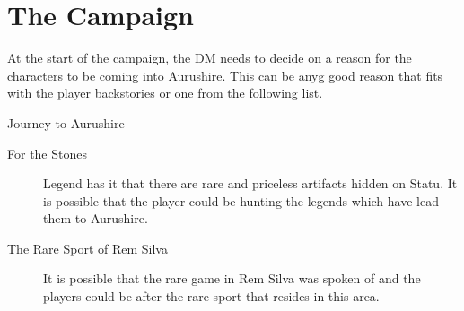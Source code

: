 \chapter{The Campaign}

At the start of the campaign, the DM needs to decide on a reason for the characters to be coming into Aurushire. This can be anyg good reason that fits with the player backstories or one from the following list.

\begin{commentbox}{Journey to Aurushire}
	\begin{description}
		\item[For the Stones] Legend has it that there are rare and priceless artifacts hidden on Statu. It is possible that the player could be hunting the legends which have lead them to Aurushire.
		\item[The Rare Sport of Rem Silva] It is possible that the rare game in Rem Silva was spoken of and the players could be after the rare sport that resides in this area.
	\end{description}
\end{commentbox}